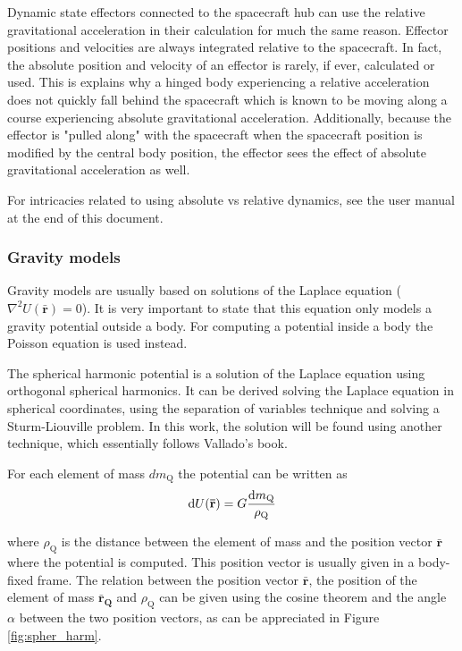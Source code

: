 Dynamic state effectors connected to the spacecraft hub can use the relative gravitational acceleration in their calculation for much the same reason. Effector positions and velocities are always integrated relative to the spacecraft. In fact, the absolute position and velocity of an effector is rarely, if ever, calculated or used. This is explains why a hinged body experiencing a relative acceleration does not quickly fall behind the spacecraft which is known to be moving along a course experiencing absolute gravitational acceleration. Additionally, because the effector is "pulled along" with the spacecraft when the spacecraft position is modified by the central body position, the effector sees the effect of absolute gravitational acceleration as well.

For intricacies related to using absolute vs relative dynamics, see the user manual at the end of this document.

\subsubsection{Gravity models}

Gravity models are usually based on solutions of the Laplace equation ($\nabla^2 U(\mathbf{\bar r}) = 0$). It is very important to state that this equation only models a gravity potential outside a body. For computing a potential inside a body the Poisson equation is used instead.

The spherical harmonic potential is a solution of the Laplace equation using orthogonal spherical harmonics. It can be derived solving the Laplace equation in spherical coordinates, using the separation of variables technique and solving a Sturm-Liouville problem. In this work, the solution will be found using another technique, which essentially follows Vallado's book\cite{vallado2013}.

For each element of mass $d m_\text{Q}$ the potential can be written as
\begin{equation}
\D U(\mathbf{\bar r}) = G \frac{\D m_\text{Q}}{\rho_\text{Q}}
\end{equation}

where $\rho_\text{Q}$ is the distance between the element of mass and the position vector $\mathbf{\bar r}$ where the potential is computed. This position vector is usually given in a body-fixed frame. The relation between the position vector $\mathbf{\bar r}$, the position of the element of mass $\mathbf{\bar r_\text{Q}}$ and $\rho_\text{Q}$ can be given using the cosine theorem and the angle $\alpha$ between the two position vectors, as can be appreciated in Figure \ref{fig:spher_harm}.

